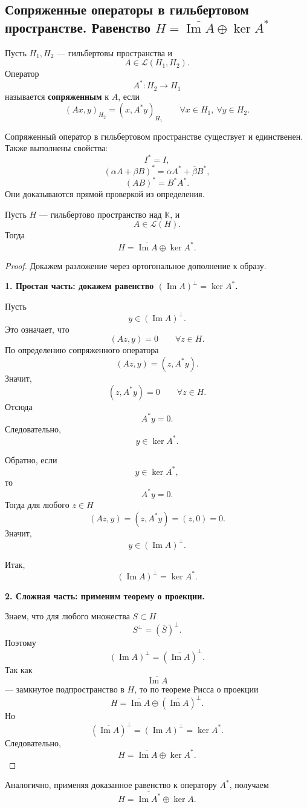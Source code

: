 \subsection{Сопряженные операторы в гильбертовом пространстве. Равенство \texorpdfstring{\(H=\overline{\operatorname{Im} A}\oplus\ker A^*\)}{H = cl Im A plus ker A*}}

\begin{definition}
	Пусть \(H_1,H_2\) --- гильбертовы пространства и
	\[
	A\in\mathcal{L}(H_1,H_2).
	\]
	Оператор
	\[
	A^*:H_2\to H_1
	\]
	называется \textbf{сопряженным} к \(A\), если
	\[
	(Ax,y)_{H_2}=(x,A^*y)_{H_1}
	\qquad
	\forall x\in H_1,\ \forall y\in H_2.
	\]
\end{definition}

\begin{remark}
	Сопряженный оператор в гильбертовом пространстве существует и единственен. Также
	выполнены свойства:
	\[
	I^*=I,
	\]
	\[
	(\alpha A+\beta B)^*
	=
	\overline{\alpha}A^*+\overline{\beta}B^*,
	\]
	\[
	(AB)^*=B^*A^*.
	\]
	Они доказываются прямой проверкой из определения.
\end{remark}

\begin{theorem}
	Пусть \(H\) --- гильбертово пространство над \(\mathbb{K}\), и
	\[
	A\in\mathcal{L}(H).
	\]
	Тогда
	\[
	H=\overline{\operatorname{Im}A}\oplus\ker A^*.
	\]
\end{theorem}

\begin{proof}
	Докажем разложение через ортогональное дополнение к образу.
	
	\textbf{1. Простая часть: докажем равенство \((\operatorname{Im}A)^\perp=\ker A^*\).}
	
	Пусть
	\[
	y\in(\operatorname{Im}A)^\perp.
	\]
	Это означает, что
	\[
	(Az,y)=0
	\qquad
	\forall z\in H.
	\]
	По определению сопряженного оператора
	\[
	(Az,y)=(z,A^*y).
	\]
	Значит,
	\[
	(z,A^*y)=0
	\qquad
	\forall z\in H.
	\]
	Отсюда
	\[
	A^*y=0.
	\]
	Следовательно,
	\[
	y\in\ker A^*.
	\]
	
	Обратно, если
	\[
	y\in\ker A^*,
	\]
	то
	\[
	A^*y=0.
	\]
	Тогда для любого \(z\in H\)
	\[
	(Az,y)=(z,A^*y)=(z,0)=0.
	\]
	Значит,
	\[
	y\in(\operatorname{Im}A)^\perp.
	\]
	
	Итак,
	\[
	(\operatorname{Im}A)^\perp=\ker A^*.
	\]
	
	\textbf{2. Сложная часть: применим теорему о проекции.}
	
	Знаем, что для любого множества \(S\subset H\)
	\[
	S^\perp=\left(\overline{S}\right)^\perp.
	\]
	Поэтому
	\[
	(\operatorname{Im}A)^\perp
	=
	\left(\overline{\operatorname{Im}A}\right)^\perp.
	\]
	Так как
	\[
	\overline{\operatorname{Im}A}
	\]
	--- замкнутое подпространство в \(H\), то по теореме Рисса о проекции
	\[
	H
	=
	\overline{\operatorname{Im}A}
	\oplus
	\left(\overline{\operatorname{Im}A}\right)^\perp.
	\]
	Но
	\[
	\left(\overline{\operatorname{Im}A}\right)^\perp
	=
	(\operatorname{Im}A)^\perp
	=
	\ker A^*.
	\]
	Следовательно,
	\[
	H=\overline{\operatorname{Im}A}\oplus\ker A^*.
	\]
\end{proof}

\begin{remark}
	Аналогично, применяя доказанное равенство к оператору \(A^*\), получаем
	\[
	H=\overline{\operatorname{Im}A^*}\oplus\ker A.
	\]
\end{remark}